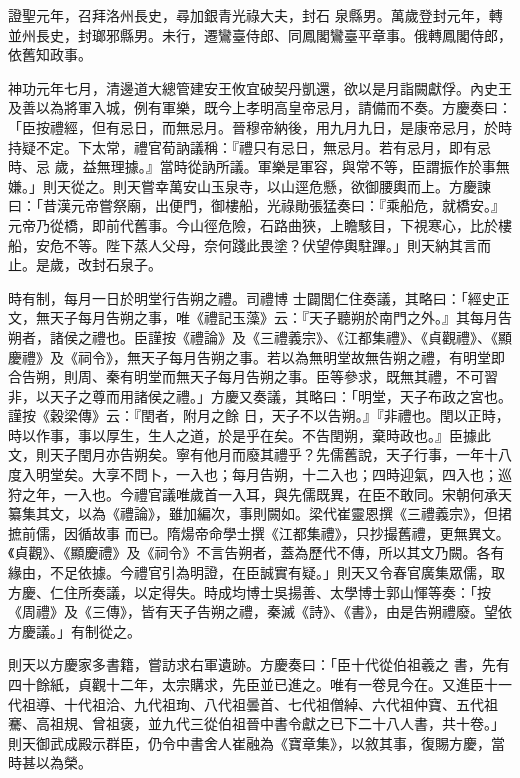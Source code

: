 \begin{pinyinscope}
 證聖元年，召拜洛州長史，尋加銀青光祿大夫，封石
 泉縣男。萬歲登封元年，轉並州長史，封瑯邪縣男。未行，遷鸞臺侍郎、同鳳閣鸞臺平章事。俄轉鳳閣侍郎，依舊知政事。



 神功元年七月，清邊道大總管建安王攸宜破契丹凱還，欲以是月詣闕獻俘。內史王及善以為將軍入城，例有軍樂，既今上孝明高皇帝忌月，請備而不奏。方慶奏曰：「臣按禮經，但有忌日，而無忌月。晉穆帝納後，用九月九日，是康帝忌月，於時持疑不定。下太常，禮官荀訥議稱：『禮只有忌日，無忌月。若有忌月，即有忌時、忌
 歲，益無理據。』當時從訥所議。軍樂是軍容，與常不等，臣謂振作於事無嫌。」則天從之。則天嘗幸萬安山玉泉寺，以山逕危懸，欲御腰輿而上。方慶諫曰：「昔漢元帝嘗祭廟，出便門，御樓船，光祿勛張猛奏曰：『乘船危，就橋安。』元帝乃從橋，即前代舊事。今山徑危險，石路曲狹，上瞻駭目，下視寒心，比於樓船，安危不等。陛下蒸人父母，奈何踐此畏塗？伏望停輿駐蹕。」則天納其言而止。是歲，改封石泉子。



 時有制，每月一日於明堂行告朔之禮。司禮博
 士闢閭仁住奏議，其略曰：「經史正文，無天子每月告朔之事，唯《禮記玉藻》云：『天子聽朔於南門之外。』其每月告朔者，諸侯之禮也。臣謹按《禮論》及《三禮義宗》、《江都集禮》、《貞觀禮》、《顯慶禮》及《祠令》，無天子每月告朔之事。若以為無明堂故無告朔之禮，有明堂即合告朔，則周、秦有明堂而無天子每月告朔之事。臣等參求，既無其禮，不可習非，以天子之尊而用諸侯之禮。」方慶又奏議，其略曰：「明堂，天子布政之宮也。謹按《穀梁傳》云：『閏者，附月之餘
 日，天子不以告朔。』『非禮也。閏以正時，時以作事，事以厚生，生人之道，於是乎在矣。不告閏朔，棄時政也。』臣據此文，則天子閏月亦告朔矣。寧有他月而廢其禮乎？先儒舊說，天子行事，一年十八度入明堂矣。大享不問卜，一入也；每月告朔，十二入也；四時迎氣，四入也；巡狩之年，一入也。今禮官議唯歲首一入耳，與先儒既異，在臣不敢同。宋朝何承天纂集其文，以為《禮論》，雖加編次，事則闕如。梁代崔靈恩撰《三禮義宗》，但捃摭前儒，因循故事
 而已。隋煬帝命學士撰《江都集禮》，只抄撮舊禮，更無異文。《貞觀》、《顯慶禮》及《祠令》不言告朔者，蓋為歷代不傳，所以其文乃闕。各有緣由，不足依據。今禮官引為明證，在臣誠實有疑。」則天又令春官廣集眾儒，取方慶、仁住所奏議，以定得失。時成均博士吳揚善、太學博士郭山惲等奏：「按《周禮》及《三傳》，皆有天子告朔之禮，秦滅《詩》、《書》，由是告朔禮廢。望依方慶議。」有制從之。



 則天以方慶家多書籍，嘗訪求右軍遺跡。方慶奏曰：「臣十代從伯祖羲之
 書，先有四十餘紙，貞觀十二年，太宗購求，先臣並已進之。唯有一卷見今在。又進臣十一代祖導、十代祖洽、九代祖珣、八代祖曇首、七代祖僧綽、六代祖仲寶、五代祖騫、高祖規、曾祖褒，並九代三從伯祖晉中書令獻之已下二十八人書，共十卷。」則天御武成殿示群臣，仍令中書舍人崔融為《寶章集》，以敘其事，復賜方慶，當時甚以為榮。




\end{pinyinscope}
